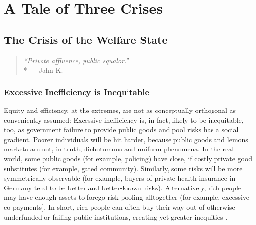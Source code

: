 


\chapter[Three Crises]{A Tale of Three Crises} \label{chap:3-crises}


\section{The Crisis of the Welfare State}

\begin{quote}
	\emph{``Private affluence, public squalor.''}\\*
	--- John K. \citealt{Galbraith1959}
\end{quote}


	

\subsection{Excessive Inefficiency is Inequitable} \label{sec:InefficiencyIsInequitable}
Equity and efficiency, at the extremes, are not as conceptually orthogonal as conveniently assumed: Excessive inefficiency is, in fact, likely to be inequitable, too, as government failure to provide public goods and pool risks has a social gradient. Poorer individuals will be hit harder, because public goods and lemons markets are not, in truth, dichotomous and uniform phenomena. In the real world, some public goods (for example, policing) have close, if costly private good substitutes (for example, gated community). Similarly, some risks will be more symmetrically observable (for example, buyers of private health insurance in Germany tend to be better and better-known risks). Alternatively, rich people may have enough assets to forego risk pooling alltogether (for example, excessive co-payments). In short, rich people can often buy their way out of otherwise underfunded or failing public institutions, creating yet greater inequities \citep{Barry2002}.

